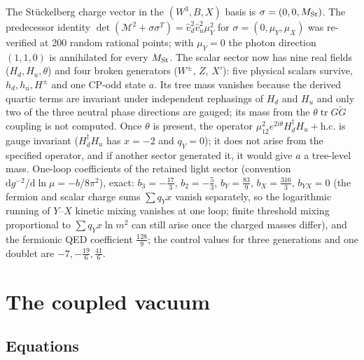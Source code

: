 \documentclass[11pt,letterpaper]{article}
\DeclareMathOperator{\tr}{tr}
\newcommand{\dd}{\mathrm d}
\newcommand{\Mb}{\mathcal M}
\begin{document}
The Stückelberg charge vector in the $(W^3,B,X)$ basis is $\sigma=(0,0,M_{\rm St})$. The predecessor identity $\det(\Mb^2+\sigma\sigma^{T})=\hat v_d^2\hat v_u^2\mu_Y^2$ for $\sigma=(0,\mu_Y,\mu_X)$ was re-verified at 200 random rational points; with $\mu_Y=0$ the photon direction $(1,1,0)$ is annihilated for every $M_{\rm St}$. The scalar sector now has nine real fields ($H_d,H_u,\theta$) and four broken generators ($W^\pm$, $Z$, $X'$): five physical scalars survive, $h_d,h_u,H^\pm$ and one CP-odd state $a$. Its tree mass vanishes because the derived quartic terms are invariant under independent rephasings of $H_d$ and $H_u$ and only two of the three neutral phase directions are gauged; its mass from the $\theta\tr G\tilde G$ coupling is not computed. Once $\theta$ is present, the operator $\mu_{12}^2e^{2i\theta}H_d^\dagger H_u+\text{h.c.}$ is gauge invariant ($H_d^\dagger H_u$ has $x=-2$ and $q_Y=0$); it does not arise from the specified operator, and if another sector generated it, it would give $a$ a tree-level mass. One-loop coefficients of the retained light sector (convention $\dd g^{-2}/\dd\ln\mu=-b/8\pi^2$), exact: $b_3=-\tfrac{17}3$, $b_2=-\tfrac53$, $b_Y=\tfrac{83}9$, $b_X=\tfrac{316}3$, $b_{YX}=0$ (the fermion and scalar charge sums $\sum q_Yx$ vanish separately, so the logarithmic running of $Y$--$X$ kinetic mixing vanishes at one loop; finite threshold mixing proportional to $\sum q_Yx\ln m^2$ can still arise once the charged masses differ), and the fermionic QED coefficient $\tfrac{128}9$; the control values for three generations and one doublet are $-7,-\tfrac{19}6,\tfrac{41}6$.

\section{The coupled vacuum}

\subsection{Equations}
\end{document}
